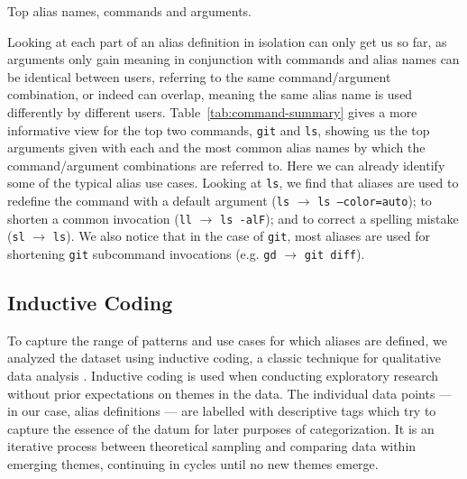 \documentclass[smallextended,natbib]{svjour3}
\newcommand{\per}[1]{\numprint[\%]{#1}}
\newcommand{\alias}[2]{{\texttt{#1} $\rightarrow$ \texttt{#2}}}
\newcommand{\cmd}[1]{{\texttt{#1}}}
\begin{document}
\begin{table}
    \centering
    \caption{Top alias names, commands and arguments.}
    \label{tab:top-summary}
    
\end{table}

Looking at each part of an alias definition in isolation can only get us so far, as arguments only gain meaning in conjunction with commands and alias names can be identical between users, referring to the same command/argument combination, or indeed can overlap, meaning the same alias name is used differently by different users.
Table~\ref{tab:command-summary} gives a more informative view for the top two commands, \texttt{git} and \texttt{ls}, showing us the top arguments given with each and the most common alias names by which the command/argument combinations are referred to.
Here we can already identify some of the typical alias use cases.
Looking at \texttt{ls}, we find that aliases are used
to redefine the command with a default argument (\alias{ls}{ls --color=auto});
to shorten a common invocation (\alias{ll}{ls -alF});
and to correct a spelling mistake (\alias{sl}{ls}).
We also notice that in the case of \texttt{git}, most aliases are used for shortening \texttt{git} subcommand invocations (e.g. \alias{gd}{git diff}).

\begin{table}
    \centering
    \caption{Top two commands with top arguments and aliases. %
		}
    \label{tab:command-summary}
    
\end{table}

\subsection{Inductive Coding}

To capture the range of patterns and use cases for which aliases are defined, we analyzed the dataset using inductive coding, a classic technique for qualitative data analysis \citep{saldana:16,thomas:06,dey:03}.
Inductive coding is used when conducting exploratory research without prior expectations on themes in the data.
The individual data points --- in our case, alias definitions --- are labelled with descriptive tags which try to capture the essence of the datum for later purposes of categorization.
It is an iterative process between theoretical sampling and comparing data within emerging themes, continuing in cycles until no new themes emerge.
\end{document}
